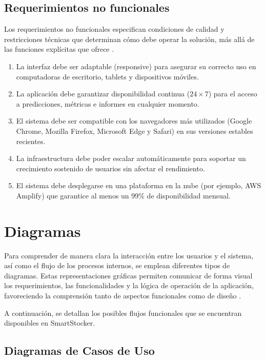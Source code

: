 \subsection{Requerimientos no funcionales}\label{sec:requerimientos-no-funcionales}
Los requerimientos no funcionales especifican condiciones de calidad y restricciones técnicas que determinan cómo debe operar la solución, más allá de las funciones explícitas que ofrece \parencite{ieee2008}.
\begin{enumerate}[label=\textbf{RNF\arabic*}, leftmargin=2.8cm]
    \item La interfaz debe ser adaptable (responsive) para asegurar su correcto uso en computadoras de escritorio, tablets y dispositivos móviles.
    \item La aplicación debe garantizar disponibilidad continua ($24 \times 7$) para el acceso a predicciones, métricas e informes en cualquier momento.
    \item El sistema debe ser compatible con los navegadores más utilizados (Google Chrome, Mozilla Firefox, Microsoft Edge y Safari) en sus versiones estables recientes.
    \item La infraestructura debe poder escalar automáticamente para soportar un crecimiento sostenido de usuarios sin afectar el rendimiento.
    \item El sistema debe desplegarse en una plataforma en la nube (por ejemplo, AWS Amplify) que garantice al menos un 99\% de disponibilidad mensual.
\end{enumerate}

\section{Diagramas}\label{sec:diagramas}

Para comprender de manera clara la interacción entre los usuarios y el sistema, así como el flujo de los procesos internos, se emplean diferentes tipos de diagramas. Estas representaciones gráficas permiten comunicar de forma visual los requerimientos, las funcionalidades y la lógica de operación de la aplicación, favoreciendo la comprensión tanto de aspectos funcionales como de diseño \parencite{booch2005uml}. 

A continuación, se detallan los posibles flujos funcionales que se encuentran disponibles en SmartStocker.

\subsection{Diagramas de Casos de Uso}\label{sec:diagramas-casos-uso}

